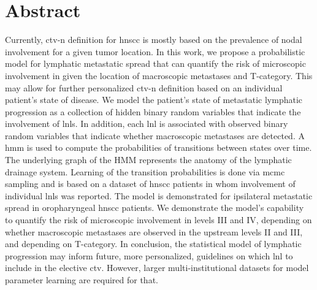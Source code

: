 \documentclass[\relativeRoot/main.tex]{subfiles}
\begin{document}
\section{Abstract}
\label{sec:unilateral:abstract}

Currently, \acrfull{ctv-n} definition for \acrfull{hnscc} is mostly based on the prevalence of nodal involvement for a given tumor location. In this work, we propose a probabilistic model for lymphatic metastatic spread that can quantify the risk of microscopic involvement in  given the location of macroscopic metastases and T-category. This may allow for further personalized \gls{ctv-n} definition based on an individual patient's state of disease. We model the patient's state of metastatic lymphatic progression as a collection of hidden binary random variables that indicate the involvement of \glspl{lnl}. In addition, each \gls{lnl} is associated with observed binary random variables that indicate whether macroscopic metastases are detected. A \acrfull{hmm} is used to compute the probabilities of transitions between states over time. The underlying graph of the HMM represents the anatomy of the lymphatic drainage system. Learning of the transition probabilities is done via \gls{mcmc} sampling and is based on a dataset of \gls{hnscc} patients in whom involvement of individual \glspl{lnl} was reported. The model is demonstrated for ipsilateral metastatic spread in oropharyngeal \gls{hnscc} patients. We demonstrate the model's capability to quantify the risk of microscopic involvement in levels III and IV, depending on whether macroscopic metastases are observed in the upstream levels II and III, and depending on T-category. In conclusion, the statistical model of lymphatic progression may inform future, more personalized, guidelines on which \gls{lnl} to include in the elective \acrshort{ctv}. However, larger multi-institutional datasets for model parameter learning are required for that.
\end{document}
